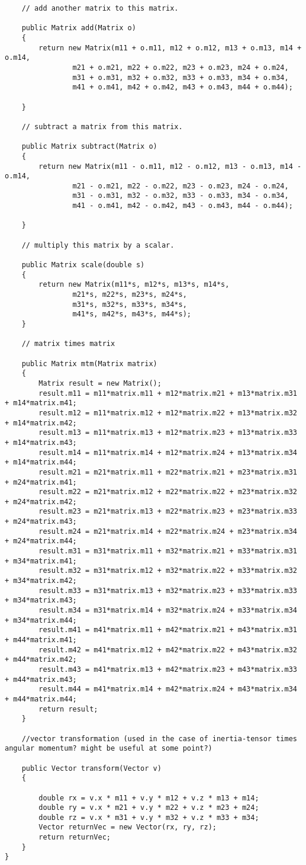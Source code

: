 \documentclass[10pt]{article}
\begin{document}
\begin{verbatim}
	// add another matrix to this matrix.

	public Matrix add(Matrix o)
	{
		return new Matrix(m11 + o.m11, m12 + o.m12, m13 + o.m13, m14 + o.m14, 
				m21 + o.m21, m22 + o.m22, m23 + o.m23, m24 + o.m24,
				m31 + o.m31, m32 + o.m32, m33 + o.m33, m34 + o.m34,
				m41 + o.m41, m42 + o.m42, m43 + o.m43, m44 + o.m44);
		
	}

	// subtract a matrix from this matrix.

	public Matrix subtract(Matrix o)
	{
		return new Matrix(m11 - o.m11, m12 - o.m12, m13 - o.m13, m14 - o.m14, 
				m21 - o.m21, m22 - o.m22, m23 - o.m23, m24 - o.m24,
				m31 - o.m31, m32 - o.m32, m33 - o.m33, m34 - o.m34,
				m41 - o.m41, m42 - o.m42, m43 - o.m43, m44 - o.m44);
		
	}

	// multiply this matrix by a scalar.

	public Matrix scale(double s)
	{
		return new Matrix(m11*s, m12*s, m13*s, m14*s, 
				m21*s, m22*s, m23*s, m24*s,
				m31*s, m32*s, m33*s, m34*s,
				m41*s, m42*s, m43*s, m44*s);
	}

	// matrix times matrix

	public Matrix mtm(Matrix matrix)
	{
		Matrix result = new Matrix();
		result.m11 = m11*matrix.m11 + m12*matrix.m21 + m13*matrix.m31 + m14*matrix.m41;
		result.m12 = m11*matrix.m12 + m12*matrix.m22 + m13*matrix.m32 + m14*matrix.m42;
		result.m13 = m11*matrix.m13 + m12*matrix.m23 + m13*matrix.m33 + m14*matrix.m43;
		result.m14 = m11*matrix.m14 + m12*matrix.m24 + m13*matrix.m34 + m14*matrix.m44;
		result.m21 = m21*matrix.m11 + m22*matrix.m21 + m23*matrix.m31 + m24*matrix.m41;
		result.m22 = m21*matrix.m12 + m22*matrix.m22 + m23*matrix.m32 + m24*matrix.m42;
		result.m23 = m21*matrix.m13 + m22*matrix.m23 + m23*matrix.m33 + m24*matrix.m43;
		result.m24 = m21*matrix.m14 + m22*matrix.m24 + m23*matrix.m34 + m24*matrix.m44;
		result.m31 = m31*matrix.m11 + m32*matrix.m21 + m33*matrix.m31 + m34*matrix.m41;
		result.m32 = m31*matrix.m12 + m32*matrix.m22 + m33*matrix.m32 + m34*matrix.m42;
		result.m33 = m31*matrix.m13 + m32*matrix.m23 + m33*matrix.m33 + m34*matrix.m43;
		result.m34 = m31*matrix.m14 + m32*matrix.m24 + m33*matrix.m34 + m34*matrix.m44;
		result.m41 = m41*matrix.m11 + m42*matrix.m21 + m43*matrix.m31 + m44*matrix.m41;
		result.m42 = m41*matrix.m12 + m42*matrix.m22 + m43*matrix.m32 + m44*matrix.m42;
		result.m43 = m41*matrix.m13 + m42*matrix.m23 + m43*matrix.m33 + m44*matrix.m43;
		result.m44 = m41*matrix.m14 + m42*matrix.m24 + m43*matrix.m34 + m44*matrix.m44;
		return result;
	}

	//vector transformation (used in the case of inertia-tensor times angular momentum? might be useful at some point?)
	
	public Vector transform(Vector v)
	{
		
		double rx = v.x * m11 + v.y * m12 + v.z * m13 + m14;
		double ry = v.x * m21 + v.y * m22 + v.z * m23 + m24;
		double rz = v.x * m31 + v.y * m32 + v.z * m33 + m34;
		Vector returnVec = new Vector(rx, ry, rz);
		return returnVec;
	}
}
\end{verbatim}
\end{document}
